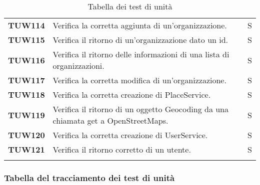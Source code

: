 \documentclass[../../piano-di-qualifica.tex]{subfiles}
\begin{document}
\begin{longtable}[H]{>{\centering\bfseries}m{3cm} >{}m{10cm} >{\centering\arraybackslash}m{3cm}}
TUW114             & Verifica la corretta aggiunta di un'organizzazione. & S \\ 
 
TUW115             & Verifica il ritorno di un'organizzazione dato un id. & S \\ 

TUW116             & Verifica il ritorno delle informazioni di una lista di organizzazioni. & S \\ 

TUW117             & Verifica la corretta modifica di un'organizzazione. & S \\ 

TUW118             & Verifica la corretta creazione di PlaceService. & S \\ 

TUW119             & Verifica il ritorno di un oggetto Geocoding da una chiamata get a OpenStreetMaps. & S \\ 
 

TUW120             & Verifica la corretta creazione di UserService. & S \\ 

TUW121             & Verifica il ritorno corretto di un utente. & S \\ 

  \rowcolor{white}
  \caption{Tabella dei test di unità}%
  \label{tab:test_di_unità}
\end{longtable}


\subsubsection{Tabella del tracciamento dei test di unità}%
\label{subsub:tabella_tracciamento_test_di_unita}
\end{document}
